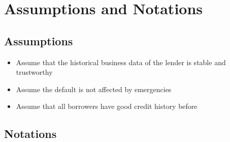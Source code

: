 \documentclass{mcmthesis}
\begin{document}
\section{Assumptions and Notations}
\subsection{Assumptions}
\begin{itemize}
\item Assume that the historical business data of the lender is stable and trustworthy
\item Assume the default is not affected by emergencies
\item Assume that all borrowers have good credit history before
\end{itemize}

\subsection{Notations}
\end{document}
